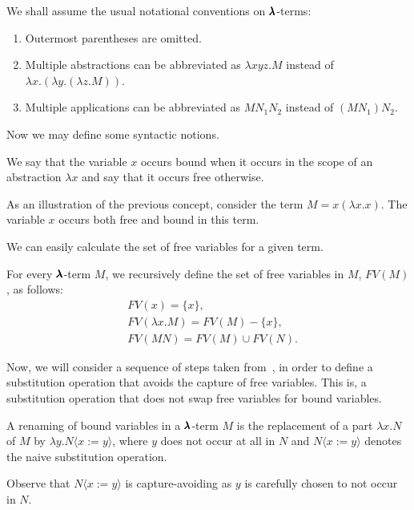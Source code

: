 \begin{notation}
  We shall assume the usual notational conventions on $\pmb{\lambda}$-terms:

  \begin{enumerate}
  \item Outermost parentheses are omitted.
  \item Multiple abstractions can be abbreviated as $\lambda x y z . M$ instead of  $\lambda x . (\lambda y . (\lambda z . M))$.
  \item Multiple applications can be abbreviated as $M N_1 N_2$ instead of $(M N_1) N_2$.
  \end{enumerate}
\end{notation}

Now we may define some syntactic notions.

\begin{definition}
	We say that the variable $x$ occurs bound when it occurs in the scope of an abstraction $\lambda x$ and say that it occurs free otherwise.
\end{definition}

As an illustration of the previous concept, consider the term $M = x (\lambda x . x)$.
The variable $x$ occurs both free and bound in this term.

We can easily calculate the set of free variables for a given term.

\begin{definition}
  For every $\pmb{\lambda}$-term $M$, we recursively define the set of free variables in $M$, $FV(M)$, as follows:  
  \begin{align*}
    & FV( x ) = \{ x \}, \\
    & FV( \lambda x . M ) = FV(M) - \{ x \}, \\
    & FV( M N ) = FV(M) \cup FV(N).
  \end{align*}
\end{definition}

Now, we will consider a sequence of steps taken from~\cite{Barendregt1987}, in order to define a substitution operation that avoids the capture of free variables.
This is, a substitution operation that does not swap free variables for bound variables.

\begin{definition}
 A renaming of bound variables in a $\pmb{\lambda}$-term $M$ is the replacement of a part $\lambda x . N$ of $M$ by $\lambda y . N \langle x:=y \rangle$, where $y$ does not occur at all in $N$ and $N \langle x:=y \rangle$ denotes the naive substitution operation.
 
 Observe that $N \langle x:=y \rangle$ is capture-avoiding as $y$ is carefully chosen to not occur in $N$.
\end{definition}

